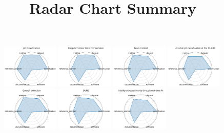 \documentclass{article}
\title{Radar Chart Summary}
\date{}
\begin{document}
\maketitle

\begin{figure}[ht!]
\centering
\includegraphics[width=0.2400\textwidth]{Jet Classification_radar.pdf}
\includegraphics[width=0.2400\textwidth]{Irregular Sensor Data Compression_radar.pdf}
\includegraphics[width=0.2400\textwidth]{Beam Control_radar.pdf}
\includegraphics[width=0.2400\textwidth]{Ultrafast jet classification at the HL-LHC_radar.pdf}
\\[1ex]
\includegraphics[width=0.2400\textwidth]{Quench detection_radar.pdf}
\includegraphics[width=0.2400\textwidth]{DUNE_radar.pdf}
\includegraphics[width=0.2400\textwidth]{Intelligent experiments through real-time AI_radar.pdf}

\end{figure}
\end{document}
